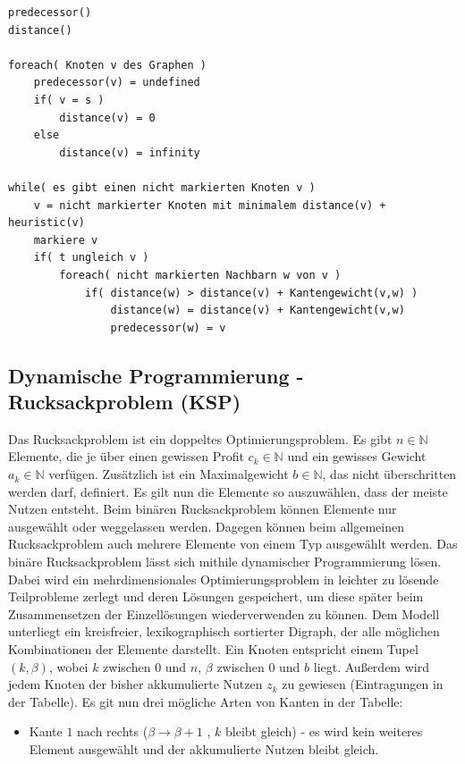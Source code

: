\documentclass[10pt,a4paper,landscape]{article}
\begin{document}
\begin{multicols*}{2}
\begin{verbatim}
predecessor()
distance()

foreach( Knoten v des Graphen )
    predecessor(v) = undefined
    if( v = s )
        distance(v) = 0
    else
        distance(v) = infinity

while( es gibt einen nicht markierten Knoten v )
    v = nicht markierter Knoten mit minimalem distance(v) + heuristic(v)
    markiere v
    if( t ungleich v )
        foreach( nicht markierten Nachbarn w von v )
            if( distance(w) > distance(v) + Kantengewicht(v,w) )
                distance(w) = distance(v) + Kantengewicht(v,w)
                predecessor(w) = v
    \end{verbatim}
\normalsize

    \subsection{ Dynamische Programmierung - Rucksackproblem (KSP) }
    Das Rucksackproblem ist ein doppeltes Optimierungsproblem. Es gibt $n \in \mathbb{N}$ Elemente, 
    die je über einen gewissen Profit $c_k \in \mathbb{N}$ und ein gewisses Gewicht $a_k \in \mathbb{N}$ verfügen. 
    Zusätzlich ist ein Maximalgewicht $b \in \mathbb{N}$, das nicht überschritten werden darf, definiert. 
    Es gilt nun die Elemente so auszuwählen, dass der meiste Nutzen entsteht.
    \newline
    Beim binären Rucksackproblem können Elemente nur ausgewählt oder weggelassen werden. Dagegen können beim allgemeinen Rucksackproblem 
    auch mehrere Elemente von einem Typ ausgewählt werden.
    \newline
    Das binäre Rucksackproblem lässt sich mithile dynamischer Programmierung lösen. Dabei wird ein mehrdimensionales Optimierungsproblem
    in leichter zu lösende Teilprobleme zerlegt und deren Lösungen gespeichert, um diese später beim Zusammensetzen der Einzellösungen 
    wiederverwenden zu können. Dem Modell unterliegt ein kreisfreier, lexikographisch sortierter Digraph, der alle möglichen Kombinationen der Elemente 
    darstellt. Ein Knoten entspricht einem Tupel $(k,\beta)$, wobei $k$ zwischen $0$ und $n$, $\beta$ zwischen $0$ und $b$ liegt. 
    Außerdem wird jedem Knoten der bisher akkumulierte Nutzen $z_k$ zu gewiesen (Eintragungen in der Tabelle).
    \newline
    Es git nun drei mögliche Arten von Kanten in der Tabelle:
    \begin{itemize}
        \item Kante $1$ nach rechts ($\beta \rightarrow \beta + 1$ , $k$ bleibt gleich) - es wird kein weiteres Element ausgewählt und der akkumulierte Nutzen bleibt gleich.

\end{itemize}
\end{multicols*}
\end{document}
